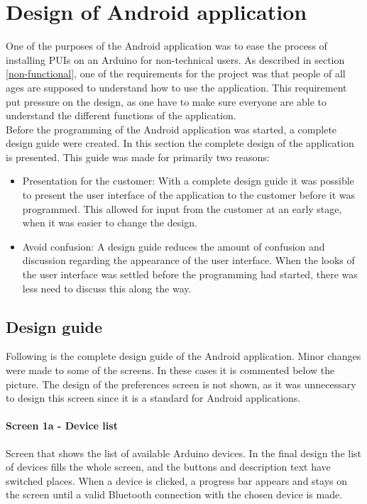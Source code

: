 \section{Design of Android application}
One of the purposes of the Android application was to ease the process of installing PUIs on an Arduino for non-technical users. As described in section \ref{non-functional}, one of the requirements for the project was that people of all ages are supposed to understand how to use the application. This requirement put pressure on the design, as one have to make sure everyone are able to understand the different functions of the application. \\
\newline
Before the programming of the Android application was started, a complete design guide were created. In this section the complete design of the application is presented. This guide was made for primarily two reasons:
\begin{itemize}
	\item{Presentation for the customer:} With a complete design guide it was possible to present the user interface of the application to the customer before it was programmed. This allowed for input from the customer at an early stage, when it was easier to change the design.
	\item{Avoid confusion:} A design guide reduces the amount of confusion and discussion regarding the appearance of the user interface. When the looks of the user interface was settled before the programming had started, there was less need to discuss this along the way.
\end{itemize}

\subsection{Design guide}
Following is the complete design guide of the Android application. Minor changes were made to some of the screens. In these cases it is commented below the picture. The design of the preferences screen is not shown, as it was unnecessary to design this screen since it is a standard for Android applications.

\paragraph{Screen 1a - Device list}
Screen that shows the list of available Arduino devices. In the final design the list of devices fills the whole screen, and the buttons and description text have switched places. When a device is clicked, a progress bar appears and stays on the screen until a valid Bluetooth connection with the chosen device is made.

